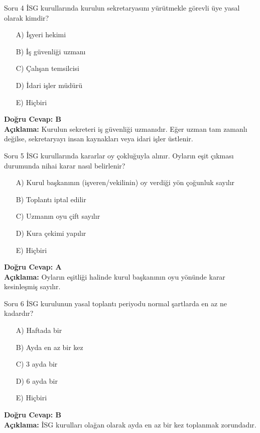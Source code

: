 \documentclass[12pt,a4paper]{article}
\begin{document}
\begin{testcard}{Soru 4}
    İSG kurullarında kurulun sekretaryasını yürütmekle görevli üye yasal olarak kimdir?
    \begin{itemize}
        \item[A)] İşyeri hekimi
        \item[B)] İş güvenliği uzmanı
        \item[C)] Çalışan temsilcisi
        \item[D)] İdari işler müdürü
        \item[E)] Hiçbiri
    \end{itemize}
    \tcblower
    \textbf{Doğru Cevap: B} \\
    \textbf{Açıklama:} Kurulun sekreteri iş güvenliği uzmanıdır. Eğer uzman tam zamanlı değilse, sekretaryayı insan kaynakları veya idari işler üstlenir.
\end{testcard}

\begin{testcard}{Soru 5}
    İSG kurullarında kararlar oy çokluğuyla alınır. Oyların eşit çıkması durumunda nihai karar nasıl belirlenir?
    \begin{itemize}
        \item[A)] Kurul başkanının (işveren/vekilinin) oy verdiği yön çoğunluk sayılır
        \item[B)] Toplantı iptal edilir
        \item[C)] Uzmanın oyu çift sayılır
        \item[D)] Kura çekimi yapılır
        \item[E)] Hiçbiri
    \end{itemize}
    \tcblower
    \textbf{Doğru Cevap: A} \\
    \textbf{Açıklama:} Oyların eşitliği halinde kurul başkanının oyu yönünde karar kesinleşmiş sayılır.
\end{testcard}

\begin{testcard}{Soru 6}
    İSG kurulunun yasal toplantı periyodu normal şartlarda en az ne kadardır?
    \begin{itemize}
        \item[A)] Haftada bir
        \item[B)] Ayda en az bir kez
        \item[C)] 3 ayda bir
        \item[D)] 6 ayda bir
        \item[E)] Hiçbiri
    \end{itemize}
    \tcblower
    \textbf{Doğru Cevap: B} \\
    \textbf{Açıklama:} İSG kurulları olağan olarak ayda en az bir kez toplanmak zorundadır.
\end{testcard}
\end{document}
